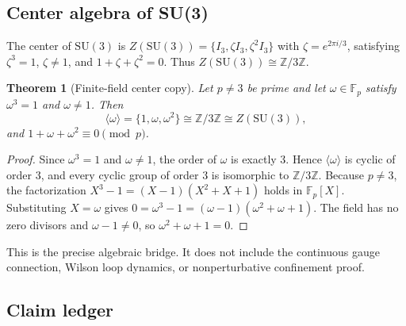 \documentclass[12pt,oneside]{article}
\theoremstyle{principia}
\newtheorem{theorem}{Theorem}[section]
\theoremstyle{definition}
\theoremstyle{remark}
\providecommand{\ZZ}{\mathbb{Z}}
\providecommand{\FF}{\mathbb{F}}
\begin{document}
\subsection{Center algebra of SU(3)}

The center of $\mathrm{SU}(3)$ is $Z(\mathrm{SU}(3)) = \{I_3, \zeta I_3, \zeta^2 I_3\}$ with $\zeta = e^{2\pi i/3}$, satisfying $\zeta^3 = 1$, $\zeta \neq 1$, and $1 + \zeta + \zeta^2 = 0$. Thus $Z(\mathrm{SU}(3)) \cong \ZZ/3\ZZ$.

\begin{theorem}[Finite-field center copy]\label{thm:center}
Let $p \neq 3$ be prime and let $\omega \in \FF_p$ satisfy $\omega^3 = 1$ and $\omega \neq 1$. Then
\[
\langle \omega \rangle = \{1, \omega, \omega^2\} \cong \ZZ/3\ZZ \cong Z(\mathrm{SU}(3)),
\]
and $1 + \omega + \omega^2 \equiv 0 \pmod{p}$.
\end{theorem}

\begin{proof}
Since $\omega^3 = 1$ and $\omega \neq 1$, the order of $\omega$ is exactly 3. Hence $\langle \omega \rangle$ is cyclic of order 3, and every cyclic group of order 3 is isomorphic to $\ZZ/3\ZZ$. Because $p \neq 3$, the factorization $X^3 - 1 = (X - 1)(X^2 + X + 1)$ holds in $\FF_p[X]$. Substituting $X = \omega$ gives $0 = \omega^3 - 1 = (\omega - 1)(\omega^2 + \omega + 1)$. The field has no zero divisors and $\omega - 1 \neq 0$, so $\omega^2 + \omega + 1 = 0$. \qedhere
\end{proof}

This is the precise algebraic bridge. It does not include the continuous gauge connection, Wilson loop dynamics, or nonperturbative confinement proof.

\subsection{Claim ledger}
\end{document}
